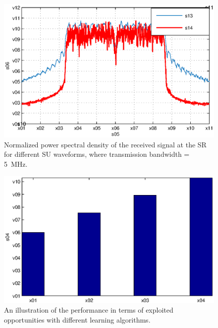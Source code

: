 \documentclass[conference, twocolumn]{IEEEtran}
\begin{document}
\begin{figure}[!t]

\centering
\includegraphics[width= 0.95 \columnwidth]{figures/OFDMvsFBMC}
\caption{Normalized power spectral density of the received signal at the SR for different SU waveforms, where transmission bandwidth = \SI{5}{MHz}.}
\label{fig:Waveform}
\vspace{-2mm}
\end{figure}
\begin{figure}[!t]

\centering
\includegraphics[width= 0.95 \columnwidth]{figures/Learning}
\caption{An illustration of the performance in terms of exploited opportunities with different learning algorithms.} 
\label{fig:Learning}
\vspace{-7mm}
\end{figure}
\vspace{22mm}



\end{document}
